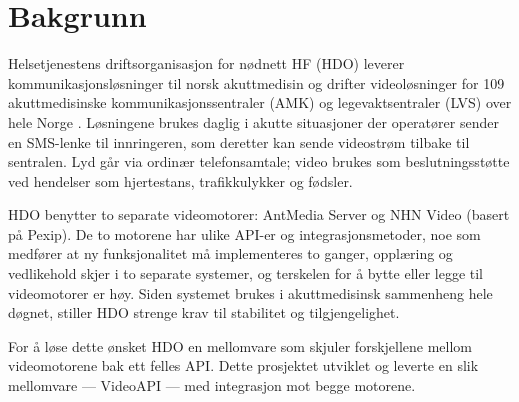 \section{Bakgrunn}
\label{sec:bakgrunn}

Helsetjenestens driftsorganisasjon for nødnett HF (HDO) leverer 
kommunikasjonsløsninger til norsk akuttmedisin og drifter 
videoløsninger for 109 akuttmedisinske kommunikasjonssentraler 
(AMK) og legevaktsentraler (LVS) over hele Norge 
\cite{hdo_kravspec}. Løsningene brukes daglig i akutte situasjoner 
der operatører sender en SMS-lenke til innringeren, som deretter 
kan sende videostrøm tilbake til sentralen. Lyd går via ordinær 
telefonsamtale; video brukes som beslutningsstøtte ved hendelser 
som hjertestans, trafikkulykker og fødsler.

HDO benytter to separate videomotorer: AntMedia Server og NHN 
Video (basert på Pexip). De to motorene har ulike API-er og 
integrasjonsmetoder, noe som medfører at ny funksjonalitet må 
implementeres to ganger, opplæring og vedlikehold skjer i to 
separate systemer, og terskelen for å bytte eller legge til 
videomotorer er høy. Siden systemet brukes i akuttmedisinsk 
sammenheng hele døgnet, stiller HDO strenge krav til stabilitet 
og tilgjengelighet.

For å løse dette ønsket HDO en mellomvare som skjuler forskjellene 
mellom videomotorene bak ett felles API. Dette prosjektet 
utviklet og leverte en slik mellomvare — VideoAPI — med integrasjon 
mot begge motorene.